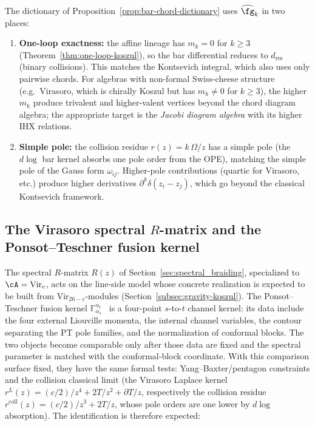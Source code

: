 \begin{remark}
\label{rem:why-affine}
The dictionary of Proposition~\ref{prop:bar-chord-dictionary}
uses $\widehat{\fg}_k$ in two places:
\begin{enumerate}
\item \textbf{One-loop exactness:} the affine lineage has
 $m_k = 0$ for $k \geq 3$
 (Theorem~\ref{thm:one-loop-koszul}), so the bar differential
 reduces to $d_{\mathrm{res}}$ (binary collisions). This
 matches the Kontsevich integral, which also uses only pairwise
 chords. For algebras with non-formal Swiss-cheese structure (e.g.\ Virasoro, which is chirally Koszul but has $m_k \neq 0$ for $k \geq 3$), the higher
 $m_k$ produce trivalent and higher-valent vertices beyond the
 chord diagram algebra; the appropriate target is the
 \emph{Jacobi diagram algebra} with its higher IHX relations.
\item \textbf{Simple pole:} the collision residue
 $r(z) = k\,\Omega/z$ has a simple pole (the $d\log$ bar kernel absorbs one pole order from the OPE), matching the
 simple pole of the Gauss form $\omega_{ij}$. Higher-pole
 contributions (quartic for Virasoro, etc.) produce higher
 derivatives $\partial^k \delta(z_i - z_j)$, which go beyond
 the classical Kontsevich framework.
\end{enumerate}
\end{remark}


\subsection{The Virasoro spectral $R$-matrix and the
Ponsot--Teschner fusion kernel}
\label{subsec:virasoro-R-PT}

\providecommand{\PT}{\mathrm{PT}}

The spectral $R$-matrix $R(z)$ of Section~\ref{sec:spectral_braiding},
specialized to $\cA = \mathrm{Vir}_c$, acts on the line-side model
whose concrete realization is expected to be built from
$\mathrm{Vir}_{26-c}$-modules (Section~\ref{subsec:gravity-koszul}).
The Ponsot--Teschner fusion kernel
$\mathbb{F}_{\alpha_s}^{\alpha_t}$~\cite{PT01} is a four-point
$s$-to-$t$ channel kernel: its data include the four external
Liouville momenta, the internal channel variables, the contour
separating the PT pole families, and the normalization of conformal
blocks. The two objects become comparable only after those data are
fixed and the spectral parameter is matched with the conformal-block
coordinate. With this comparison surface fixed, they have the same
formal tests: Yang--Baxter/pentagon constraints and the collision
classical limit (the Virasoro Laplace kernel
$r^L(z) = (c/2)/z^4 + 2T/z^2 + \partial T/z$, respectively the
collision residue $r^{\mathrm{coll}}(z) = (c/2)/z^3 + 2T/z$, whose pole
orders are one lower by $d\log$ absorption). The identification is
therefore expected:

